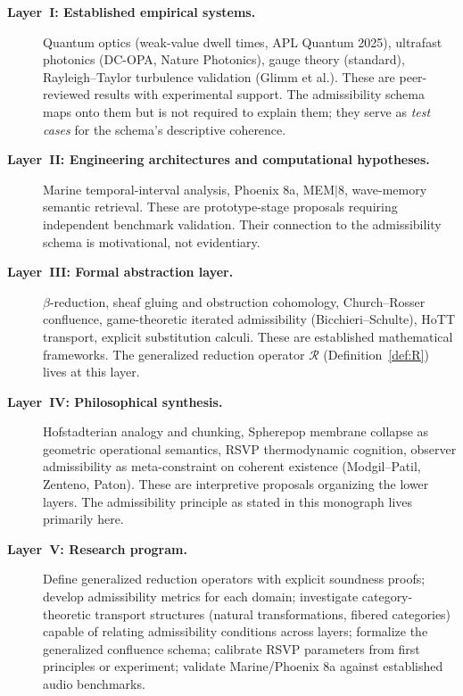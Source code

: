 \documentclass[12pt, a4paper]{article}
\theoremstyle{plain}
\theoremstyle{definition}
\theoremstyle{remark}
\newcommand{\Rcal}{\mathcal{R}}
\begin{document}
\begin{description}
  \item[\textbf{Layer~I: Established empirical systems.}]
    Quantum optics (weak-value dwell times, APL Quantum 2025),
    ultrafast photonics (DC-OPA, Nature Photonics),
    gauge theory (standard),
    Rayleigh--Taylor turbulence validation (Glimm et al.).
    These are peer-reviewed results with experimental support.
    The admissibility schema maps onto them but is not required
    to explain them; they serve as \emph{test cases} for the
    schema's descriptive coherence.

  \item[\textbf{Layer~II: Engineering architectures and computational
    hypotheses.}]
    Marine temporal-interval analysis, Phoenix 8a, MEM$|$8,
    wave-memory semantic retrieval.
    These are prototype-stage proposals requiring independent
    benchmark validation.
    Their connection to the admissibility schema is motivational,
    not evidentiary.

  \item[\textbf{Layer~III: Formal abstraction layer.}]
    $\beta$-reduction, sheaf gluing and obstruction cohomology,
    Church--Rosser confluence, game-theoretic iterated admissibility
    (Bicchieri--Schulte), HoTT transport, explicit substitution calculi.
    These are established mathematical frameworks.
    The generalized reduction operator $\Rcal$ (Definition~\ref{def:R})
    lives at this layer.

  \item[\textbf{Layer~IV: Philosophical synthesis.}]
    Hofstadterian analogy and chunking,
    Spherepop membrane collapse as geometric operational semantics,
    RSVP thermodynamic cognition,
    observer admissibility as meta-constraint on coherent existence
    (Modgil--Patil, Zenteno, Paton).
    These are interpretive proposals organizing the lower layers.
    The admissibility principle as stated in this monograph lives
    primarily here.

  \item[\textbf{Layer~V: Research program.}]
    Define generalized reduction operators with explicit soundness
    proofs; develop admissibility metrics for each domain;
    investigate category-theoretic transport structures (natural
    transformations, fibered categories) capable of relating
    admissibility conditions across layers; formalize the
    generalized confluence schema; calibrate RSVP parameters
    from first principles or experiment; validate Marine/Phoenix 8a
    against established audio benchmarks.
\end{description}
\end{document}

